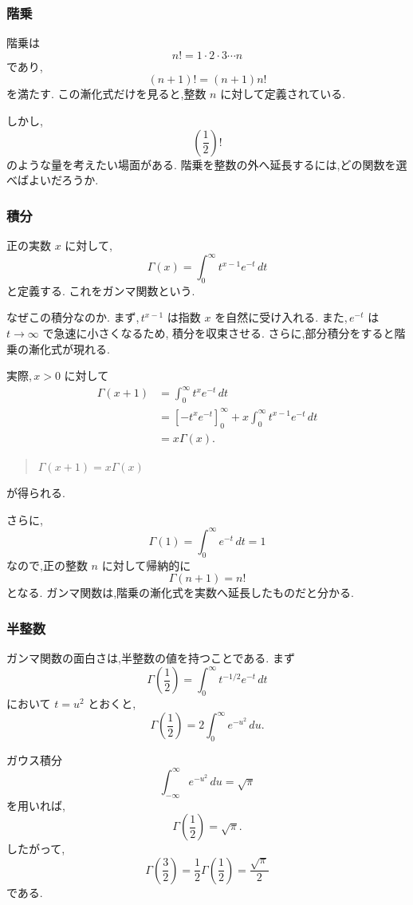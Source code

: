 \subsubsection{階乗}

階乗は
\[
  n!=1\cdot2\cdot3\cdots n
\]
であり,
\[
  (n+1)!=(n+1)n!
\]
を満たす.
この漸化式だけを見ると,整数 $n$ に対して定義されている.

しかし,
\[
  \left(\frac12\right)!
\]
のような量を考えたい場面がある.
階乗を整数の外へ延長するには,どの関数を選べばよいだろうか.

\subsubsection{積分}

正の実数 $x$ に対して,
\[
  \Gamma(x)=\int_0^\infty t^{x-1}e^{-t}\,dt
\]
と定義する.
これをガンマ関数という.

なぜこの積分なのか.
まず,\,$t^{x-1}$ は指数 $x$ を自然に受け入れる.
また,\,$e^{-t}$ は $t\to\infty$ で急速に小さくなるため,
積分を収束させる.
さらに,部分積分をすると階乗の漸化式が現れる.

実際,\,$x>0$ に対して
\[
\begin{aligned}
  \Gamma(x+1)
  &=\int_0^\infty t^x e^{-t}\,dt\\
  &=\left[-t^xe^{-t}\right]_0^\infty
    +x\int_0^\infty t^{x-1}e^{-t}\,dt\\
  &=x\Gamma(x).
\end{aligned}
\]
\begin{quote}
  $\Gamma(x+1)=x\Gamma(x)$
\end{quote}
が得られる.

さらに,
\[
  \Gamma(1)=\int_0^\infty e^{-t}\,dt=1
\]
なので,正の整数 $n$ に対して帰納的に
\[
  \Gamma(n+1)=n!
\]
となる.
ガンマ関数は,階乗の漸化式を実数へ延長したものだと分かる.

\subsubsection{半整数}

ガンマ関数の面白さは,半整数の値を持つことである.
まず
\[
  \Gamma\left(\frac12\right)
  =\int_0^\infty t^{-1/2}e^{-t}\,dt
\]
において $t=u^2$ とおくと,
\[
  \Gamma\left(\frac12\right)
  =2\int_0^\infty e^{-u^2}\,du.
\]

ガウス積分
\[
  \int_{-\infty}^{\infty}e^{-u^2}\,du=\sqrt{\pi}
\]
を用いれば,
\[
  \Gamma\left(\frac12\right)=\sqrt{\pi}.
\]
したがって,
\[
  \Gamma\left(\frac32\right)
  =\frac12\Gamma\left(\frac12\right)
  =\frac{\sqrt{\pi}}2
\]
である.

